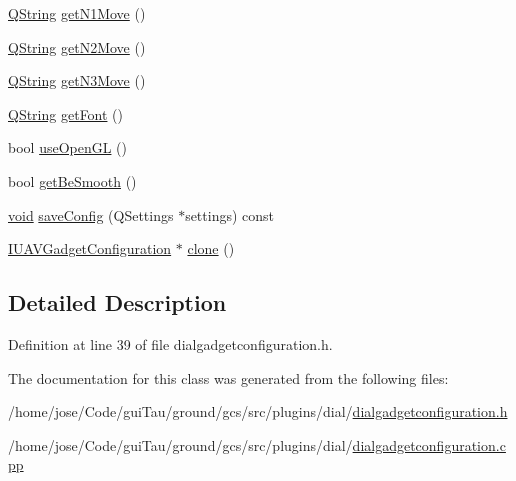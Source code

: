 \begin{DoxyCompactItemize}
\item 
\hyperlink{group___u_a_v_objects_plugin_gab9d252f49c333c94a72f97ce3105a32d}{Q\-String} \hyperlink{group___dial_plugin_ga694808f332bd385339fa07b6aa6ad67b}{get\-N1\-Move} ()
\item 
\hyperlink{group___u_a_v_objects_plugin_gab9d252f49c333c94a72f97ce3105a32d}{Q\-String} \hyperlink{group___dial_plugin_gaa268e84615e3dfe79b2ea85a21015c0f}{get\-N2\-Move} ()
\item 
\hyperlink{group___u_a_v_objects_plugin_gab9d252f49c333c94a72f97ce3105a32d}{Q\-String} \hyperlink{group___dial_plugin_ga8b12211d47ec10eb85af4daeecd76cff}{get\-N3\-Move} ()
\item 
\hyperlink{group___u_a_v_objects_plugin_gab9d252f49c333c94a72f97ce3105a32d}{Q\-String} \hyperlink{group___dial_plugin_ga2b36383d1efea1dc3848e79d6b73ab32}{get\-Font} ()
\item 
bool \hyperlink{group___dial_plugin_ga71692739b0299dea2c880fc33df5817f}{use\-Open\-G\-L} ()
\item 
bool \hyperlink{group___dial_plugin_ga47cfbeb46101ecdebf8073f133bbbbc1}{get\-Be\-Smooth} ()
\item 
\hyperlink{group___u_a_v_objects_plugin_ga444cf2ff3f0ecbe028adce838d373f5c}{void} \hyperlink{group___dial_plugin_ga77e000666d924bfc77a05a04b30d00f8}{save\-Config} (Q\-Settings $\ast$settings) const 
\item 
\hyperlink{group___core_plugin_gacdfdf0b1e39b5002472b76b6564ce51f}{I\-U\-A\-V\-Gadget\-Configuration} $\ast$ \hyperlink{group___dial_plugin_ga4cb0aa67ea10afa557dbf083d67f2510}{clone} ()
\end{DoxyCompactItemize}


\subsection{Detailed Description}


Definition at line 39 of file dialgadgetconfiguration.\-h.



The documentation for this class was generated from the following files\-:\begin{DoxyCompactItemize}
\item 
/home/jose/\-Code/gui\-Tau/ground/gcs/src/plugins/dial/\hyperlink{dialgadgetconfiguration_8h}{dialgadgetconfiguration.\-h}\item 
/home/jose/\-Code/gui\-Tau/ground/gcs/src/plugins/dial/\hyperlink{dialgadgetconfiguration_8cpp}{dialgadgetconfiguration.\-cpp}\end{DoxyCompactItemize}
